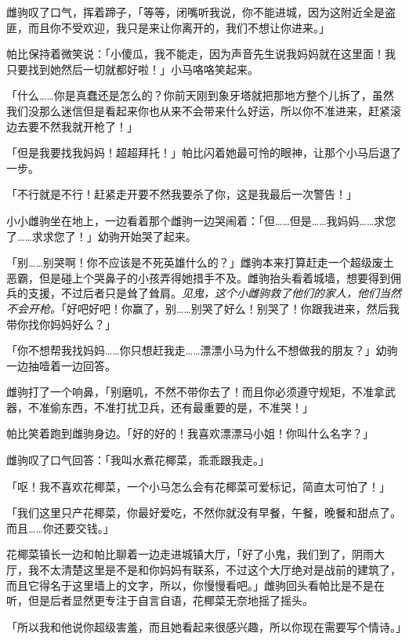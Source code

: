 雌驹叹了口气，挥着蹄子，「等等，闭嘴听我说，你不能进城，因为这附近全是盗匪，而且你不受欢迎，我只是来让你离开的，我们不想让你进来。」

帕比保持着微笑说：「小傻瓜，我不能走，因为声音先生说我妈妈就在这里面！我只要找到她然后一切就都好啦！」小马咯咯笑起来。

「什么……你是真蠢还是怎么的？你前天刚到象牙塔就把那地方整个儿拆了，虽然我们没那么迷信但是看起来你也从来不会带来什么好运，所以你不准进来，赶紧滚边去要不然我就开枪了！」

「但是我要找我妈妈！超超拜托！」帕比闪着她最可怜的眼神，让那个小马后退了一步。

「不行就是不行！赶紧走开要不然我要杀了你，这是我最后一次警告！」

小小雌驹坐在地上，一边看着那个雌驹一边哭闹着：「但……但是……我妈妈……求您了……求求您了！」幼驹开始哭了起来。

「别……别哭啊！你不应该是不死英雄什么的？」雌驹本来打算赶走一个超级废土恶霸，但是碰上个哭鼻子的小孩弄得她措手不及。雌驹抬头看着城墙，想要得到佣兵的支援，不过后者只是耸了耸肩。\emph{见鬼，这个小雌驹救了他们的家人，他们当然不会开枪。}「好吧好吧！你赢了，别……别哭了好么！别哭了！你跟我进来，然后我带你找你妈妈好么？」

「你不想帮我找妈妈……你只想赶我走……漂漂小马为什么不想做我的朋友？」幼驹一边抽噎着一边回答。

雌驹打了一个响鼻，「别磨叽，不然不带你去了！而且你必须遵守规矩，不准拿武器，不准偷东西，不准打扰卫兵，还有最重要的是，不准哭！」


帕比笑着跑到雌驹身边。「好的好的！我喜欢漂漂马小姐！你叫什么名字？」

雌驹叹了口气回答：「我叫水煮花椰菜，乖乖跟我走。」

「呕！我不喜欢花椰菜，一个小马怎么会有花椰菜可爱标记，简直太可怕了！」

「我们这里只产花椰菜，你最好爱吃，不然你就没有早餐，午餐，晚餐和甜点了。而且……你还要交钱。」

\horizonline


花椰菜镇长一边和帕比聊着一边走进城镇大厅，「好了小鬼，我们到了，阴雨大厅，我不太清楚这里是不是和你妈妈有联系，不过这个大厅绝对是战前的建筑了，而且它得名于这里墙上的文字，所以，你慢慢看吧。」雌驹回头看帕比是不是在听，但是后者显然更专注于自言自语，花椰菜无奈地摇了摇头。

「所以我和他说你超级害羞，而且她看起来很感兴趣，所以你现在需要写个情诗。」

